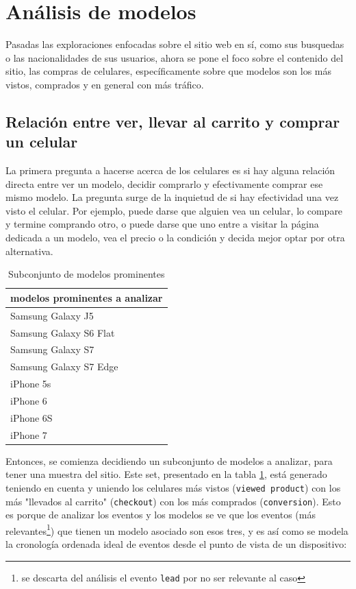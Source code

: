 \documentclass[a4paper]{article}
\begin{document}
\section{Análisis de modelos} \label{modelo}

Pasadas las exploraciones enfocadas sobre el sitio web en sí, como sus busquedas o las nacionalidades de sus usuarios, ahora se pone el foco sobre el contenido del sitio, las compras de celulares, específicamente sobre que modelos son los más vistos, comprados y en general con más tráfico.

\subsection{Relación entre ver, llevar al carrito y comprar un celular}

La primera pregunta a hacerse acerca de los celulares es si hay alguna relación directa entre ver un modelo, decidir comprarlo y efectivamente comprar ese mismo modelo. La pregunta surge de la inquietud de si hay efectividad una vez visto el celular. Por ejemplo, puede darse que alguien vea un celular, lo compare y termine comprando otro, o puede darse que uno entre a visitar la página dedicada a un modelo, vea el precio o la condición y decida mejor optar por otra alternativa.

\begin{table}[!h]
	\begin{center}
		\begin{tabular}{|l|}
			\hline
			modelos prominentes a analizar \\
			\hline \hline
			Samsung Galaxy J5 \\ \hline
			Samsung Galaxy S6 Flat \\ \hline
			Samsung Galaxy S7 \\ \hline
			Samsung Galaxy S7 Edge \\ \hline
			iPhone 5s \\ \hline
			iPhone 6 \\ \hline
			iPhone 6S \\ \hline
			iPhone 7 \\ \hline
		\end{tabular}
		\caption{Subconjunto de modelos prominentes}
		\label{table:modelos_prominentes}
	\end{center}
\end{table}

Entonces, se comienza decidiendo un subconjunto de modelos a analizar, para tener una muestra del sitio. Este set, presentado en la tabla \ref{table:modelos_prominentes}, está generado teniendo en cuenta y uniendo los celulares más vistos (\texttt{viewed product}) con los más "llevados al carrito" (\texttt{checkout}) con los más comprados (\texttt{conversion}). Esto es porque de analizar los eventos y los modelos se ve que los eventos (más relevantes\footnote{se descarta del análisis el evento \texttt{lead} por no ser relevante al caso}) que tienen un modelo asociado son esos tres, y es así como se modela la cronología ordenada ideal de eventos desde el punto de vista de un dispositivo:
\end{document}
